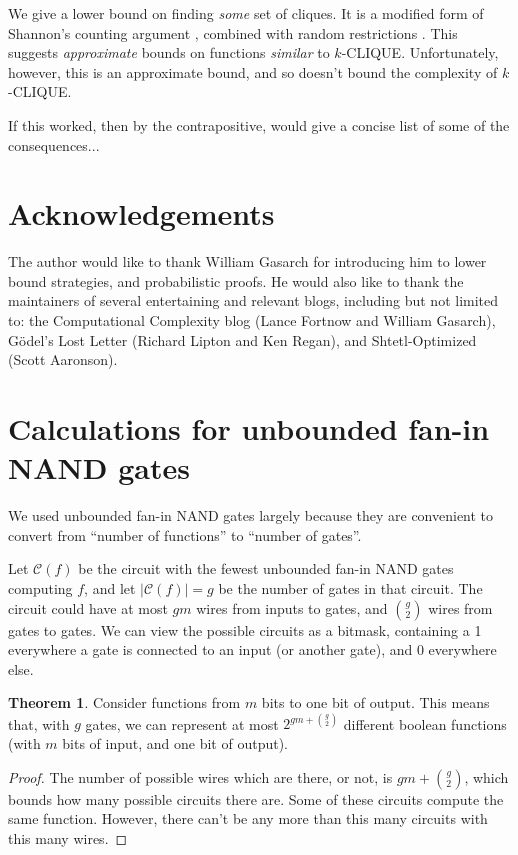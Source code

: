 \documentclass[12pt]{article}
\theoremstyle{definition}
\newtheorem{thm}{Theorem}[section]
\newcommand{\bigC}[0]{\mathcal{C}}
\begin{document}
We give a lower bound on finding {\em some} set of cliques.
It is a modified form of Shannon's counting argument
\cite{shannon_synthesis_1949}, combined with random restrictions
\cite{subbotovskaya1963comparison} \cite{hastad1987lower}.
This suggests {\em approximate} bounds on functions {\em similar} to $k$-CLIQUE.
Unfortunately, however, this is an approximate bound,
and so doesn't bound the complexity of $k$-CLIQUE.

If this worked, then by the contrapositive,
\cite{fenner1996complexity} would give a concise list of some of the consequences...

\section{Acknowledgements}

The author would like to thank William Gasarch for introducing him
to lower bound strategies, and probabilistic proofs.
He would also like to thank the maintainers of
several entertaining and relevant blogs, including but
not limited to: the Computational Complexity blog
(Lance Fortnow and William Gasarch), 
G\"odel's Lost Letter (Richard Lipton and Ken Regan),
and Shtetl-Optimized (Scott Aaronson). 


\appendix
\section{Calculations for unbounded fan-in NAND gates}
\label{gateMath}

We used unbounded fan-in NAND gates largely because they are
convenient to convert from ``number of functions'' to
``number of gates''.

Let $\bigC(f)$ be the circuit
with the fewest unbounded fan-in NAND
gates computing $f$, and let $|\bigC(f)| = g$ be the number of gates in
that circuit. The
circuit could have at most $gm$ wires from inputs to gates, and ${g \choose 2}$
wires from gates to gates. We can view the possible circuits as a bitmask,
containing a 1 everywhere a gate is connected to an input (or another gate),
and 0 everywhere else.

\begin{thm}
\label{boundFromCounting}
Consider functions from $m$ bits to one bit of output.
This means that, with $g$ gates, we can represent at most
$2^{gm + {g \choose 2}}$ different boolean functions (with $m$ bits of input,
and one bit of output).
\end{thm}
\begin{proof}

The number of possible wires which are there, or not, is $gm + {g \choose 2}$,
which bounds how many possible circuits there are.
Some of these circuits compute the same function.
However, there can't be any more than this many circuits with this many wires.
\end{proof}
\end{document}
